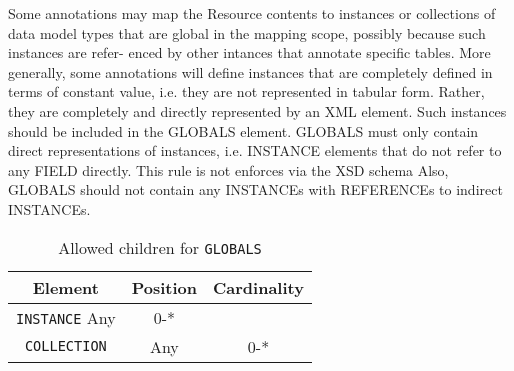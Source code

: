 Some annotations may map the Resource contents to instances or collections of data model
types that are global in the mapping scope, possibly because such instances are refer-
enced by other intances that annotate specific tables. More generally, some
annotations will define instances that are completely defined in terms of
constant value, i.e. they are not represented in tabular form. Rather, they
are completely and directly represented by an XML element.
Such instances should be included in the GLOBALS element.
GLOBALS must only contain direct representations of instances, i.e.
INSTANCE elements that do not refer to any FIELD directly. 
This rule is not enforces via the XSD schema 
Also, GLOBALS should not contain any INSTANCEs with REFERENCEs to
indirect INSTANCEs.

\begin{table}[!htbp]
\small
\centering
\begin{tabulary}{\linewidth}{|c |c |c|}
    \hline 
        \textbf{Element} &
        \textbf{Position} &
        \textbf{Cardinality}\\
    \hline      \hline  
        \texttt{INSTANCE}          
        Any &           
        0-*\\
    \hline    
        \texttt{COLLECTION} &           
        Any &           
        0-*\\
    \hline 
\end{tabulary}
     \caption{Allowed children for \texttt{GLOBALS}} 
     \label{tbl:globals-chilren}
 \end{table}